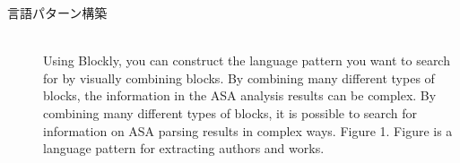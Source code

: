 \begin{description}

\item[言語パターン構築]\mbox{}\\
Using Blockly, you can construct the language pattern you want to search for by visually combining blocks.
By combining many different types of blocks, the information in the ASA analysis results can be complex. By combining many different types of blocks, it is possible to search for information on ASA parsing results in complex ways.
Figure 1. Figure is a language pattern for extracting authors and works.


\end{description}
